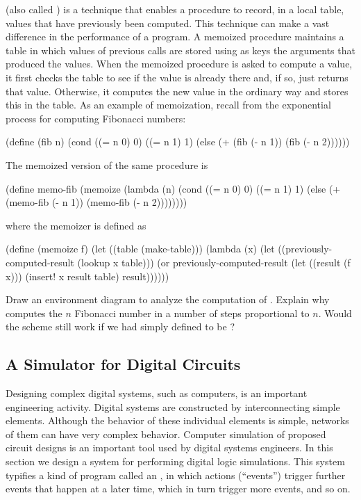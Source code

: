\begin{exercise}
	\label{Exercise 3.27}
	 (also called ) is a technique that enables a procedure to record, in a local table, values that have previously been computed.
	This technique can make a vast difference in the performance of a program.
	A memoized procedure maintains a table in which values of previous calls are stored using as keys the arguments that produced the values.
	When the memoized procedure is asked to compute a value, it first checks the table to see if the value is already there and, if so, just returns that value.
	Otherwise, it computes the new value in the ordinary way and stores this in the table.
	As an example of memoization, recall from  the exponential process for computing Fibonacci numbers:
	\begin{scheme}
	  (define (fib n)
	    (cond ((= n 0) 0)
	          ((= n 1) 1)
	          (else (+ (fib (- n 1)) (fib (- n 2))))))
	\end{scheme}
	The memoized version of the same procedure is
	\begin{scheme}
	  (define memo-fib
	    (memoize
	     (lambda (n)
	       (cond ((= n 0) 0)
	             ((= n 1) 1)
	             (else (+ (memo-fib (- n 1))
	                      (memo-fib (- n 2))))))))
	\end{scheme}
	where the memoizer is defined as
	\begin{scheme}
	  (define (memoize f)
	    (let ((table (make-table)))
	      (lambda (x)
	        (let ((previously-computed-result
	               (lookup x table)))
	          (or previously-computed-result
	              (let ((result (f x)))
	                (insert! x result table)
	                result))))))
	\end{scheme}
	Draw an environment diagram to analyze the computation of .
	Explain why  computes the \( n \) Fibonacci number in a number of steps proportional to \( n \).
	Would the scheme still work if we had simply defined  to be ?
\end{exercise}



\subsection{A Simulator for Digital Circuits}
\label{Section 3.3.4}

Designing complex digital systems, such as computers, is an important engineering activity.
Digital systems are constructed by interconnecting simple elements.
Although the behavior of these individual elements is simple, networks of them can have very complex behavior.
Computer simulation of proposed circuit designs is an important tool used by digital systems engineers.
In this section we design a system for performing digital logic simulations.
This system typifies a kind of program called an , in which actions (“events”) trigger further events that happen at a later time, which in turn trigger more events, and so on.

